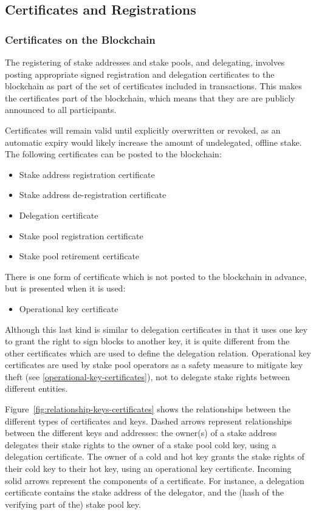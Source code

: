 \documentclass[11pt,a4paper,dvipsnames,twosided]{article}
\begin{document}
\subsection{Certificates and Registrations}
\label{certificates-and-registrations}

\subsubsection{Certificates on the Blockchain}
\label{certificates-on-the-blockchain}

The registering of stake addresses and stake pools, and delegating,
involves posting appropriate signed registration and delegation certificates to
the blockchain as part of the set of certificates included in
transactions. This makes the certificates part of
the blockchain, which means that they are are publicly announced to all
participants.

Certificates will remain valid
until explicitly overwritten or revoked, as an automatic expiry would
likely increase the amount of undelegated, offline stake. The following
certificates can be posted to the blockchain:
\begin{itemize}
\item Stake address registration certificate
\item Stake address de-registration certificate
\item Delegation certificate
\item Stake pool registration certificate
\item Stake pool retirement certificate
\end{itemize}
There is one form of certificate which is not posted to the blockchain
in advance, but is presented when it is used:
\begin{itemize}
\item
  Operational key certificate
\end{itemize}
Although this last kind is similar to delegation certificates in that
it uses one key to grant the right to sign blocks to another
key, it is quite different from the other certificates which are used
to define the delegation relation. Operational key certificates are
used by stake pool operators as a safety measure to mitigate key
theft (see \cref{operational-key-certificates}), not to delegate
stake rights between different entities.

Figure~\ref{fig:relationship-keys-certificates} shows the relationships between
the different types of certificates and keys.
%
Dashed arrows represent relationships between the different keys and addresses:
the owner(s) of a stake address delegates their stake rights to the owner of a
stake pool cold key, using a delegation certificate.
%
The owner of a cold and hot key grants the stake rights of their cold key to their
hot key, using an operational key certificate.
%
Incoming solid arrows represent the components of a certificate.
For instance, a delegation certificate contains the stake address of the
delegator, and the (hash of the verifying part of the) stake pool key.
\end{document}
